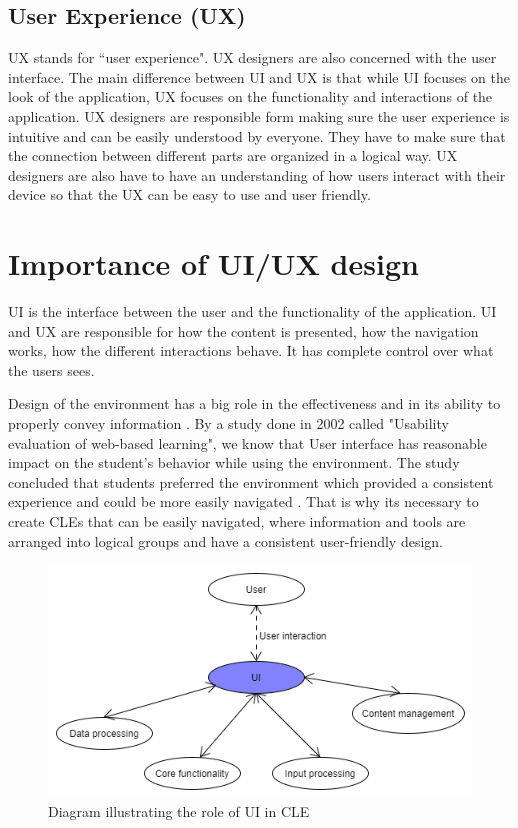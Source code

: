 \documentclass[10pt,english,a4paper]{article}
\begin{document}
\subsection{User Experience (UX)}
UX stands for ``user experience". UX designers are also concerned with the user interface\cite{theymakedesign_2019_what}. 
The main difference between UI and UX is that while UI focuses on the look of the application,
UX focuses on the functionality and interactions of the application. UX designers are 
responsible form making sure the user experience is intuitive and can be easily understood by everyone.
They have to make sure that the connection between different parts are organized in a logical way.
UX designers are also have to have an understanding of how users interact with their
device so that the UX can be easy to use and user friendly\cite{theymakedesign_2019_what}. 

\section{Importance of UI/UX design}\label{importance}
UI is the interface between the user and the functionality of the application. UI and UX are responsible for
how the content is presented, how the navigation works, how the different interactions behave. It 
has complete control over what the users sees.


Design of the environment has a big role in the effectiveness and in 
its ability to properly convey information \cite{ui/ux}. 
By a study done in 2002 called "Usability evaluation of web-based learning", we know that User interface
has reasonable impact on the student's behavior while using the environment\cite{wesson_2002_usability}.
The study concluded that students preferred the environment which provided a consistent experience and could be more easily navigated 
\cite{wesson_2002_usability}. That is why its necessary to create CLEs that can be easily navigated,
where information and tools are arranged into logical groups and have a consistent user-friendly design.

\begin{figure}[h]
    \includegraphics[width=1\textwidth]{images/ui-diagram2.png}
    \caption{Diagram illustrating the role of UI in CLE}
\end{figure}
\end{document}
